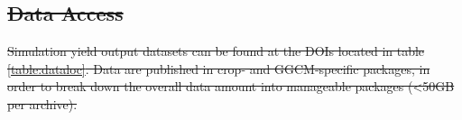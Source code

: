 \documentclass[gmd, manuscript]{copernicus} %
\providecommand{\DIFdel}[1]{{\protect\color{red}\sout{#1}}}                      %
\providecommand{\DIFdelbegin}{} %
\begin{document}
\DIFdelbegin %

\section{}
\addtocounter{section}{-1}%
\subsection{\DIFdel{Data Access}}
\addtocounter{subsection}{-1}%
\DIFdel{Simulation yield output datasets can be found at the DOIs located in table \ref{table:dataloc}. 
Data are published in crop- and GGCM-specific packages, in order to break down the overall data amount into manageable packages (<50GB per archive).
}%
\end{document}
